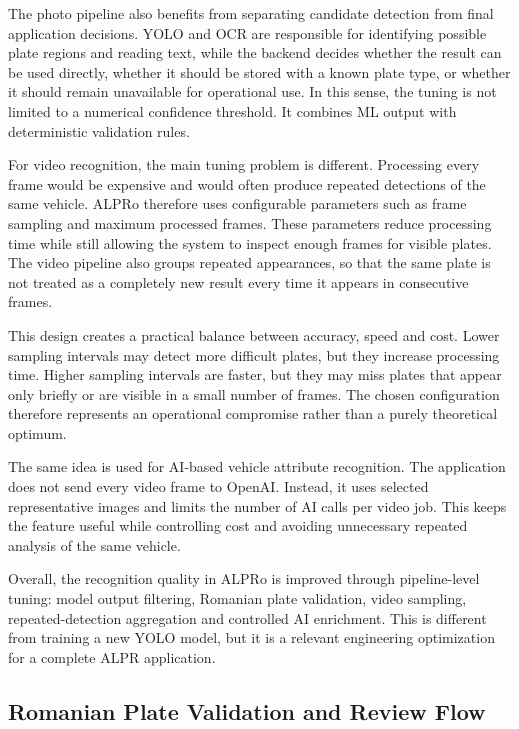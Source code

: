 ﻿\documentclass[12pt,a4paper]{article}
\begin{document}
The photo pipeline also benefits from separating candidate detection from final application decisions. YOLO and OCR are responsible for identifying possible plate regions and reading text, while the backend decides whether the result can be used directly, whether it should be stored with a known plate type, or whether it should remain unavailable for operational use. In this sense, the tuning is not limited to a numerical confidence threshold. It combines ML output with deterministic validation rules.

For video recognition, the main tuning problem is different. Processing every frame would be expensive and would often produce repeated detections of the same vehicle. ALPRo therefore uses configurable parameters such as frame sampling and maximum processed frames. These parameters reduce processing time while still allowing the system to inspect enough frames for visible plates. The video pipeline also groups repeated appearances, so that the same plate is not treated as a completely new result every time it appears in consecutive frames.

This design creates a practical balance between accuracy, speed and cost. Lower sampling intervals may detect more difficult plates, but they increase processing time. Higher sampling intervals are faster, but they may miss plates that appear only briefly or are visible in a small number of frames. The chosen configuration therefore represents an operational compromise rather than a purely theoretical optimum.

The same idea is used for AI-based vehicle attribute recognition. The application does not send every video frame to OpenAI. Instead, it uses selected representative images and limits the number of AI calls per video job. This keeps the feature useful while controlling cost and avoiding unnecessary repeated analysis of the same vehicle.

Overall, the recognition quality in ALPRo is improved through pipeline-level tuning: model output filtering, Romanian plate validation, video sampling, repeated-detection aggregation and controlled AI enrichment. This is different from training a new YOLO model, but it is a relevant engineering optimization for a complete ALPR application.

\subsection{Romanian Plate Validation and Review Flow}
\end{document}
